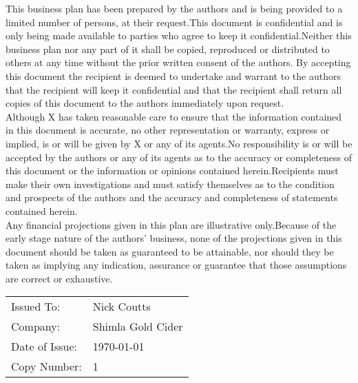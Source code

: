 \documentclass[11pt]{article}
\begin{document}
\noindent This business plan has been prepared by the authors and is being provided to a limited number of
persons, at their request.This document is confidential and is only being made available to
parties who agree to keep it confidential.Neither this business plan nor any part of it shall be
copied, reproduced or distributed to others at any time without the prior written consent of the authors.
By accepting this document the recipient is deemed to undertake and warrant to the authors that the
recipient will keep it confidential and that the recipient shall return all copies of this document
to the authors immediately upon request. \\

\noindent Although X has taken reasonable care to ensure that the information contained in this
document is accurate, no other representation or warranty, express or implied, is or will be
given by X or any of its agents.No responsibility is or will be accepted by the authors or any of its
agents as to the accuracy or completeness of this document or the information or opinions
contained herein.Recipients must make their own investigations and must satisfy themselves
as to the condition and prospects of the authors and the accuracy and completeness of statements
contained herein. \\

\noindent Any financial projections given in this plan are illustrative only.Because of the early stage
nature of the authors’ business, none of the projections given in this document should be taken as
guaranteed to be attainable, nor should they be taken as implying any indication, assurance
or guarantee that those assumptions are correct or exhaustive.


\begin{table}[H]
\begin{center}
\begin{tabular}{|p{7cm}  p{7cm} |}
\hline
Issued To:      & Nick Coutts         \\
Company:        &  Shimla Gold Cider  \\
Date of Issue:  &  \today            \\
Copy Number:    &  1                  \\
\hline
\end{tabular}
\end{center}
\end{table}

\newpage

\tableofcontents
\end{document}
